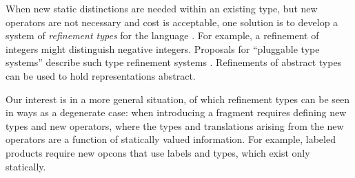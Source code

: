 \documentclass[10pt,preprint]{sigplanconf}
\begin{document}
When new static distinctions are needed within an existing type, but new operators are not necessary and cost is acceptable, one solution is to develop a system of \emph{refinement types} for the language \cite{Freeman91}. For example, a refinement of  integers might distinguish negative integers. Proposals for ``pluggable type systems'' describe such type refinement systems \cite{Brac04a,Andreae:2006:FIP:1167473.1167479}. Refinements of abstract types can be used to hold representations abstract. %

Our interest is in a more general situation, of which refinement types can be seen in ways as a degenerate case: when introducing a fragment requires defining new types and new operators, where the types and translations arising from the new operators are a  function of  statically valued information. 
For example, labeled products require new opcons that use labels and types, which exist only statically. %

\end{document}
